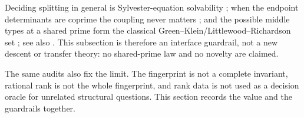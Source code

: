 Deciding splitting in general is Sylvester-equation solvability \cite{Roth1952,Gustafson1979}; when the endpoint determinants are coprime the coupling never matters \cite[Thm.~2]{Newman1974}; and the possible middle types at a shared prime form the classical Green--Klein/Littlewood--Richardson set \cite{Klein1968}; see also \cite[Thms.~4.1--4.2]{Schmidmeier2007LR}.  This subsection is therefore an interface guardrail, not a new descent or transfer theory: no shared-prime law and no novelty are claimed.

The same audits also fix the limit.  The fingerprint is not a complete invariant, rational rank is not the whole fingerprint, and rank data is not used as a decision oracle for unrelated structural questions.  This section records the value and the guardrails together.
